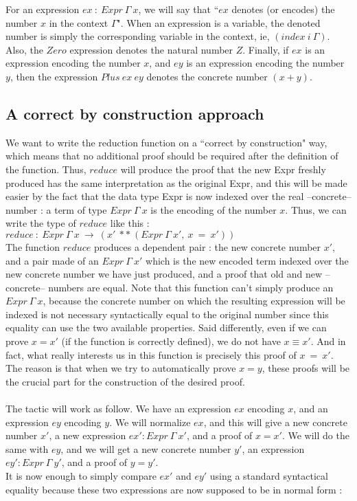 For an expression $ex\ :\ Expr\ \Gamma\ x$, we will say that ``$ex$ denotes (or encodes) the number $x$ in the context $\Gamma$".
When an expression is a variable, the denoted number is simply the corresponding variable in the context, ie, $(index\ i\ \Gamma)$.
Also, the $Zero$ expression denotes the natural number $Z$.
Finally, if $ex$ is an expression encoding the number $x$, and $ey$ is an expression encoding the number $y$, then the expression $Plus\ ex\ ey$ denotes the concrete number $(x + y)$.


\subsection{A correct by construction approach}

We want to write the reduction function on a ``correct by construction" way, which means that no additional proof should be required after the definition of the function. Thus, $reduce$ will produce the proof that the new Expr freshly produced has the same interpretation as the original Expr, and this will be made easier by the fact that the data type Expr is now indexed over the real --concrete-- number : a term of type $Expr\ \Gamma\ x$ is the encoding of the number $x$.
Thus, we can write the type of $reduce$ like this : \\
$reduce\ :\ Expr\ \Gamma\ x\ \rightarrow\ (x'\ **\ (Expr\ \Gamma\ x',\ x\ =\ x'))$ \\
The function $reduce$ produces a dependent pair : the new concrete number $x'$, and a pair made of an $Expr\ \Gamma\ x'$ which is the new encoded term indexed over the new concrete number we have just produced, and a proof that old and new --concrete-- numbers are equal.
Note that this function can't simply produce an $Expr\ \Gamma\ x$, because the concrete number on which the resulting expression will be indexed is not necessary syntactically equal to the original number since this equality can use the two available properties. Said differently, even if we can prove $x=x'$ (if the function is correctly defined), we do not have $x \equiv x'$.
And in fact, what really interests us in this function is precisely this proof of $x\ =\ x'$.
The reason is that when we try to automatically prove $x=y$, these proofs will be the crucial part for the construction of the desired proof. \\
\\
The tactic will work as follow.
We have an expression $ex$ encoding $x$, and an expression $ey$ encoding $y$. We will normalize $ex$, and this will give a new concrete number $x'$, a new expression $ex':Expr\ \Gamma\ x'$, and a proof of $x=x'$. We will do the same with $ey$, and we will get a new concrete number $y'$, an expression $ey':Expr\ \Gamma\ y'$, and a proof of $y=y'$. \\
It is now enough to simply compare $ex'$ and $ey'$ using a standard syntactical equality because these two expressions are now supposed to be in normal form :


